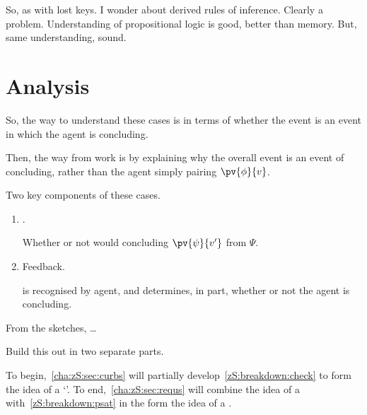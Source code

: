 \begin{note}
  So, as with lost keys.
  I wonder about derived rules of inference.
  Clearly a problem.
  Understanding of propositional logic is good, better than memory.
  But, same understanding, sound.
\end{note}

\section{Analysis}
\label{cha:zS:sec:lost-keys:analysis}

\begin{note}
  So, the way to understand these cases is in terms of whether the event is an event in which the agent is concluding.

  Then, the way  from  work is by explaining why the overall event is an event of concluding, rather than the agent simply pairing \(\pv{\phi}{v}\).
\end{note}

\begin{note}
  Two key components of these cases.
  \begin{enumerate}[label=\Roman*., ref=(\Roman*)]
  \item
    \label{zS:breakdown:check}
    .

    Whether or not would concluding \(\pv{\psi}{v'}\) from \(\Psi\).
  \item
    \label{zS:breakdown:psat}
    Feedback.

    \check{} is recognised by agent, and determines, in part, whether or not the agent is concluding.
  \end{enumerate}

  From the sketches, {\color{red} \dots}
\end{note}

\begin{note}
  Build this out in two separate parts.

  To begin,~\autoref{cha:zS:sec:curbs} will partially develop~\ref{zS:breakdown:check} to form the idea of a `\curb{}'.
  To end,~\ref{cha:zS:sec:requs} will combine the idea of a \curb{} with~\ref{zS:breakdown:psat} in the form the idea of a \requ{}.
\end{note}

